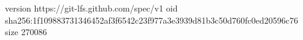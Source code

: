version https://git-lfs.github.com/spec/v1
oid sha256:1f109883731346452af3f6542c23f977a3e3939d81b3c50d760fc0ed20596c76
size 270086
